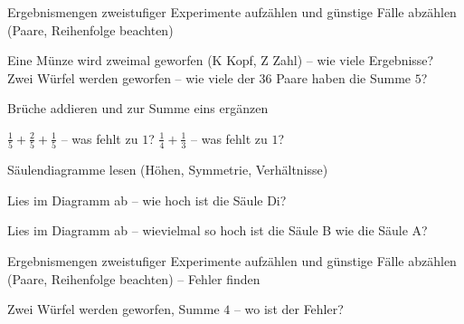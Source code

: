 \setcounter{aufgabe}{0}

\begin{aufgabe}{Ergebnismengen zweistufiger Experimente aufzählen und günstige Fälle abzählen (Paare, Reihenfolge beachten)}
\begin{teile}
\teil Eine Münze wird zweimal geworfen (K Kopf, Z Zahl) – wie viele Ergebnisse?
\teil Zwei Würfel werden geworfen – wie viele der $36$ Paare haben die Summe $5$?
\end{teile}
\end{aufgabe}

\begin{aufgabe}{Brüche addieren und zur Summe eins ergänzen}
\begin{teile}
\teil $\frac{1}{5} + \frac{2}{5} + \frac{1}{5}$ – was fehlt zu $1$?
\teil $\frac{1}{4} + \frac{1}{3}$ – was fehlt zu $1$?
\end{teile}
\end{aufgabe}

\begin{aufgabe}{Säulendiagramme lesen (Höhen, Symmetrie, Verhältnisse)}
\begin{teile}
\teil Lies im Diagramm ab – wie hoch ist die Säule Di?

\teil Lies im Diagramm ab – wievielmal so hoch ist die Säule B wie die Säule A?

\end{teile}
\end{aufgabe}

\begin{aufgabe}{Ergebnismengen zweistufiger Experimente aufzählen und günstige Fälle abzählen (Paare, Reihenfolge beachten) – Fehler finden}
\begin{teile}
\teil Zwei Würfel werden geworfen, Summe $4$ – wo ist der Fehler? 
\end{teile}
\end{aufgabe}

